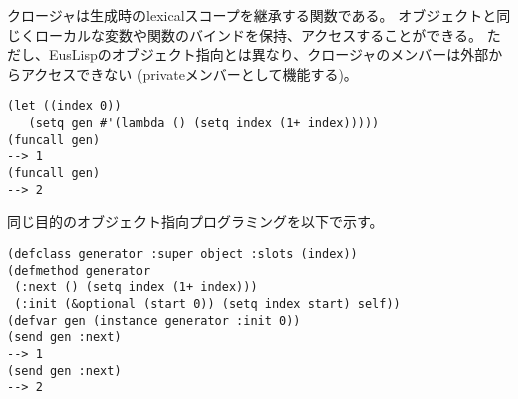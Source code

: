 クロージャは生成時のlexicalスコープを継承する関数である。
オブジェクトと同じくローカルな変数や関数のバインドを保持、アクセスすることができる。
ただし、EusLispのオブジェクト指向とは異なり、クロージャのメンバーは外部からアクセスできない
(privateメンバーとして機能する)。

\begin{verbatim}
(let ((index 0))
   (setq gen #'(lambda () (setq index (1+ index)))))
(funcall gen)
--> 1
(funcall gen)
--> 2
\end{verbatim}

同じ目的のオブジェクト指向プログラミングを以下で示す。
\begin{verbatim}
(defclass generator :super object :slots (index))
(defmethod generator
 (:next () (setq index (1+ index)))
 (:init (&optional (start 0)) (setq index start) self))
(defvar gen (instance generator :init 0))
(send gen :next)
--> 1
(send gen :next)
--> 2
\end{verbatim}
\newpage
